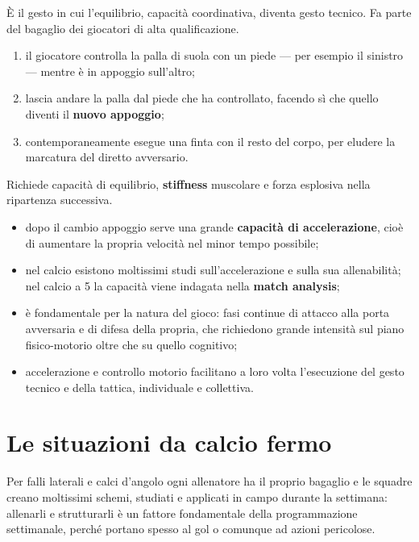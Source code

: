 È il gesto in cui l'equilibrio, capacità coordinativa, diventa gesto tecnico. Fa parte del bagaglio
dei giocatori di alta qualificazione.
\begin{enumerate}
  \item il giocatore controlla la palla di suola con un piede --- per esempio il sinistro --- mentre
    è in appoggio sull'altro;
  \item lascia andare la palla dal piede che ha controllato, facendo sì che quello diventi il
    \textbf{nuovo appoggio};
  \item contemporaneamente esegue una finta con il resto del corpo, per eludere la marcatura del
    diretto avversario.
\end{enumerate}
Richiede capacità di equilibrio, \textbf{stiffness} muscolare e forza esplosiva nella ripartenza
successiva.

\begin{itemize}
  \item dopo il cambio appoggio serve una grande \textbf{capacità di accelerazione}, cioè di
    aumentare la propria velocità nel minor tempo possibile;
  \item nel calcio esistono moltissimi studi sull'accelerazione e sulla sua allenabilità; nel calcio
    a 5 la capacità viene indagata nella \textbf{match analysis};
  \item è fondamentale per la natura del gioco: fasi continue di attacco alla porta avversaria e di
    difesa della propria, che richiedono grande intensità sul piano fisico-motorio oltre che su
    quello cognitivo;
  \item accelerazione e controllo motorio facilitano a loro volta l'esecuzione del gesto tecnico e
    della tattica, individuale e collettiva.
\end{itemize}

\section{Le situazioni da calcio fermo}

Per falli laterali e calci d'angolo ogni allenatore ha il proprio bagaglio e le squadre creano
moltissimi schemi, studiati e applicati in campo durante la settimana: allenarli e strutturarli è un
fattore fondamentale della programmazione settimanale, perché portano spesso al gol o comunque ad
azioni pericolose.

